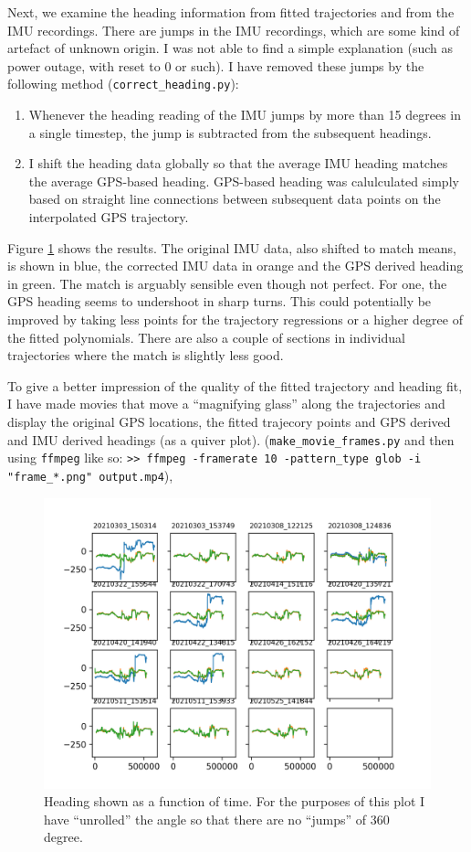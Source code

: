 \documentclass[a4]{article}
\begin{document}
Next, we examine the heading information from fitted trajectories and
from the IMU recordings. There are jumps in the IMU recordings, which
are some kind of artefact of unknown origin. I was not able to find a
simple explanation (such as power outage, with reset to 0 or such). I
have removed these jumps by the following method (\verb+correct_heading.py+):
\begin{enumerate}
  \item Whenever the heading reading of the IMU jumps by more than 15
    degrees in a single timestep, the jump is subtracted from the
    subsequent headings.
  \item I shift the heading data globally so that the average IMU
    heading matches the average GPS-based heading. GPS-based heading
    was calulculated simply based on straight line connections between
    subsequent data points on the interpolated GPS trajectory.
\end{enumerate}
Figure \ref{fig:correctHeading} shows the results. The original IMU
data, also shifted to match means, is shown in blue, the corrected IMU
data in orange and the GPS derived heading in green. The match is
arguably sensible even though not perfect. For one, the GPS heading
seems to undershoot in sharp turns. This could potentially be improved
by taking less points for the trajectory regressions or a higher
degree of the fitted polynomials. There are also a couple of sections
in individual trajectories where the match is slightly less good.

To give a better impression of the quality of the fitted trajectory
and heading fit, I have made movies that move a ``magnifying glass''
along the trajectories and display the original GPS locations, the fitted trajecory points and GPS derived and IMU derived headings
(as a quiver plot).
(\verb+make_movie_frames.py+ and then using \verb+ffmpeg+ like so:
\verb+>> ffmpeg -framerate 10 -pattern_type glob -i "frame_*.png" output.mp4+),

\begin{figure}
  \includegraphics[width=\textwidth]{figures/corrected_heading.png}
  \caption{\label{fig:correctHeading} Heading
  shown as a function of time. For the purposes of this plot I have
  ``unrolled'' the angle so that there are no ``jumps'' of 360 degree.}  
\end{figure}
\end{document}
